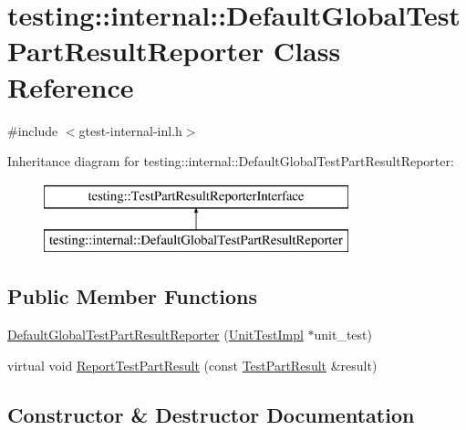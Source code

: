 \hypertarget{classtesting_1_1internal_1_1_default_global_test_part_result_reporter}{}\section{testing\+:\+:internal\+:\+:Default\+Global\+Test\+Part\+Result\+Reporter Class Reference}
\label{classtesting_1_1internal_1_1_default_global_test_part_result_reporter}


{\ttfamily \#include $<$gtest-\/internal-\/inl.\+h$>$}

Inheritance diagram for testing\+:\+:internal\+:\+:Default\+Global\+Test\+Part\+Result\+Reporter\+:\begin{figure}[H]
\begin{center}
\leavevmode
\includegraphics[height=2.000000cm]{classtesting_1_1internal_1_1_default_global_test_part_result_reporter}
\end{center}
\end{figure}
\subsection*{Public Member Functions}
\begin{DoxyCompactItemize}
\item 
\hyperlink{classtesting_1_1internal_1_1_default_global_test_part_result_reporter_a3900ea7f34b34afd48c7d1d0312a1488}{Default\+Global\+Test\+Part\+Result\+Reporter} (\hyperlink{classtesting_1_1internal_1_1_unit_test_impl}{Unit\+Test\+Impl} $\ast$unit\+\_\+test)
\item 
virtual void \hyperlink{classtesting_1_1internal_1_1_default_global_test_part_result_reporter_a6081576a23b964cfecab1e424d8044fc}{Report\+Test\+Part\+Result} (const \hyperlink{classtesting_1_1_test_part_result}{Test\+Part\+Result} \&result)
\end{DoxyCompactItemize}


\subsection{Constructor \& Destructor Documentation}
\hypertarget{classtesting_1_1internal_1_1_default_global_test_part_result_reporter_a3900ea7f34b34afd48c7d1d0312a1488}{}
